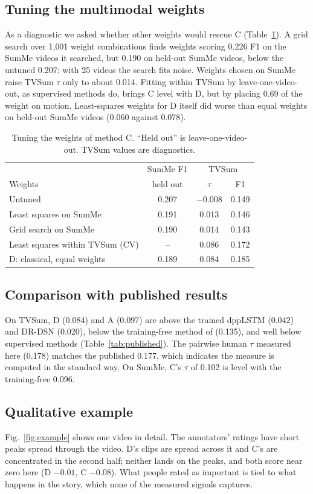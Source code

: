 \documentclass[conference]{IEEEtran}
\begin{document}
\subsection{Tuning the multimodal weights}
As a diagnostic we asked whether other weights would rescue C (Table~\ref{tab:tuning}). A grid search over 1{,}001 weight combinations finds weights scoring 0.226 F1 on the SumMe videos it searched, but 0.190 on held-out SumMe videos, below the untuned 0.207: with 25 videos the search fits noise. Weights chosen on SumMe raise TVSum $\tau$ only to about 0.014. Fitting within TVSum by leave-one-video-out, as supervised methods do, brings C level with D, but by placing 0.69 of the weight on motion. Least-squares weights for D itself did worse than equal weights on held-out SumMe videos (0.060 against 0.078).
\begin{table}[t]
\caption{Tuning the weights of method C. ``Held out'' is leave-one-video-out. TVSum values are diagnostics.}
\label{tab:tuning}
\centering
\setlength{\tabcolsep}{4pt}
\begin{tabular}{@{}lccc@{}}
\toprule
 & SumMe F1 & \multicolumn{2}{c}{TVSum} \\
Weights & held out & $\tau$ & F1 \\
\midrule
Untuned & 0.207 & $-0.008$ & 0.149 \\
Least squares on SumMe & 0.191 & 0.013 & 0.146 \\
Grid search on SumMe & 0.190 & 0.014 & 0.143 \\
Least squares within TVSum (CV) & -- & 0.086 & 0.172 \\
\midrule
D: classical, equal weights & 0.189 & 0.084 & 0.185 \\
\bottomrule
\end{tabular}
\end{table}

\subsection{Comparison with published results}
On TVSum, D (0.084) and A (0.097) are above the trained dppLSTM (0.042) and DR-DSN (0.020), below the training-free method of \cite{pang2024zeroshot} (0.135), and well below supervised methods (Table~\ref{tab:published}). The pairwise human $\tau$ measured here (0.178) matches the published 0.177, which indicates the measure is computed in the standard way. On SumMe, C's $\tau$ of 0.102 is level with the training-free 0.096.

\subsection{Qualitative example}
Fig.~\ref{fig:example} shows one video in detail. The annotators' ratings have short peaks spread through the video. D's clips are spread across it and C's are concentrated in the second half; neither lands on the peaks, and both score near zero here (D $-0.01$, C $-0.08$). What people rated as important is tied to what happens in the story, which none of the measured signals captures.
\end{document}
